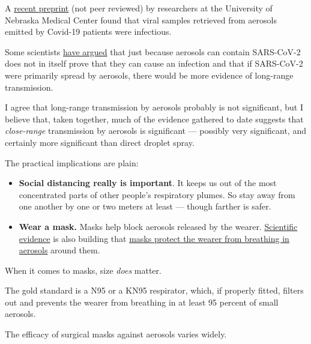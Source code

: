 A
\href{https://www.medrxiv.org/content/10.1101/2020.07.13.20041632v2}{recent
preprint} (not peer reviewed) by researchers at the University of
Nebraska Medical Center found that viral samples retrieved from aerosols
emitted by Covid-19 patients were infectious.

Some scientists
\href{https://jamanetwork.com/journals/jama/fullarticle/2768396}{have
argued} that just because aerosols can contain SARS-CoV-2 does not in
itself prove that they can cause an infection and that if SARS-CoV-2
were primarily spread by aerosols, there would be more evidence of
long-range transmission.

I agree that long-range transmission by aerosols probably is not
significant, but I believe that, taken together, much of the evidence
gathered to date suggests that \emph{close-range} transmission by
aerosols is significant --- possibly very significant, and certainly
more significant than direct droplet spray.

The practical implications are plain:

\begin{itemize}
\tightlist
\item
  \textbf{Social distancing really is important}. It keeps us out of the
  most concentrated parts of other people's respiratory plumes. So stay
  away from one another by one or two meters at least --- though farther
  is safer.
\end{itemize}

\begin{itemize}
\tightlist
\item
  \textbf{Wear a mask.} Masks help block aerosols released by the
  wearer.
  \href{https://ucsf.app.box.com/s/blvolkp5z0mydzd82rjks4wyleagt036}{Scientific
  evidence} is also building that
  \href{https://www.nytimes.com/2020/07/27/health/coronavirus-mask-protection.html?campaign_id=154\&emc=edit_cb_20200727\&instance_id=20696\&nl=coronavirus-briefing\&regi_id=65413713\&segment_id=34503\&te=1\&user_id=bd32fbf008e5183a7928ed61c60669f7}{masks
  protect the wearer from breathing in aerosols} around them.
\end{itemize}

When it comes to masks, size \emph{does} matter.

The gold standard is a N95 or a KN95 respirator, which, if properly
fitted, filters out and prevents the wearer from breathing in at least
95 percent of small aerosols.

The efficacy of surgical masks against aerosols varies widely.

